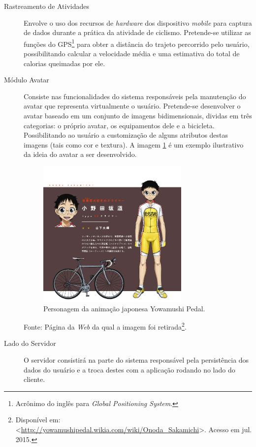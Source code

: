 \begin{description}
\item[Rastreamento de Atividades] Envolve o uso dos recursos de \textit{hardware} dos dispositivo \textit{mobile} para captura de dados durante a prática da atividade de ciclismo. Pretende-se utilizar as funções do GPS\footnote{Acrônimo do inglês para \textit{Global Positioning System}.} para obter a distância do trajeto percorrido pelo usuário, possibilitando calcular a velocidade média e uma estimativa do total de calorias queimadas por ele.

\item[Módulo Avatar] Consiste nas funcionalidades do sistema responsáveis pela manutenção do avatar que representa virtualmente o usuário. Pretende-se desenvolver o avatar baseado em um conjunto de imagens bidimensionais, dividas em três categorias: o próprio avatar, os equipamentos dele e a bicicleta. Possibilitando ao usuário a customização de alguns atributos destas imagens (tais como cor e textura). A imagem \ref{fig:exavatar} é um exemplo ilustrativo da ideia do avatar a ser desenvolvido. 

\begin{figure}[h]
    \caption{Personagem da animação japonesa Yowamushi Pedal.}
    \centerline{\includegraphics[width=20em]{figuras/exavatar.jpg}}
    \label{fig:exavatar}
\end{figure}
\centerline{Fonte: Página da \textit{Web} da qual a imagem foi retirada\footnote{Disponível em:  <\url{http://yowamushipedal.wikia.com/wiki/Onoda_Sakamichi}>. Acesso  em jul. 2015.}.}

\item[Lado do Servidor] O servidor consistirá na parte do sistema responsável pela persistência dos dados do usuário e a troca destes com a aplicação rodando no lado do cliente. \par


\end{description}
